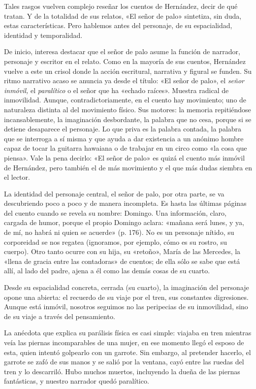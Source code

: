 \documentclass[14pt,twoside,final]{extbook} %
\begin{document}
Tales rasgos vuelven complejo reseñar los cuentos de Hernández, decir de qué tratan. Y de la totalidad de sus relatos, «El señor de palo» sintetiza, sin duda, estas características. Pero hablemos antes del personaje, de su espacialidad, identidad y temporalidad.

De inicio, interesa destacar que el señor de palo asume la función de narrador, personaje y escritor en el relato. Como en la mayoría de sus cuentos, Hernández vuelve a este un crisol donde la acción escritural, narrativa y figural se funden. Su ritmo narrativo acaso se anuncia ya desde el título: «El señor de palo», el \emph{señor inmóvil,} el \emph{paralítico} o el señor que ha «echado raíces». Muestra radical de inmovilidad. Aunque, contradictoriamente, en el cuento hay movimiento; uno de naturaleza distinta al del movimiento físico. Sus motores: la memoria repitiéndose incansablemente, la imaginación desbordante, la palabra que no cesa, porque si se detiene desaparece el personaje. Lo que priva es la palabra contada, la palabra que se interroga a sí misma y que ayuda a dar existencia a un anónimo hombre capaz de tocar la guitarra hawaiana o de trabajar en un circo como «la cosa que piensa». Vale la pena decirlo: «El señor de palo» es quizá el cuento más inmóvil de Hernández, pero también el de más movimiento y el que más dudas siembra en el lector.

La identidad del personaje central, el señor de palo, por otra parte, se va descubriendo poco a poco y de manera incompleta. Es hasta las últimas páginas del cuento cuando se revela su nombre: Domingo. Una información, claro, cargada de humor, porque el propio Domingo aclara: «mañana será lunes, y ya, de mí, no habrá ni quien se acuerde» (p. 176). No es un personaje nítido, su corporeidad se nos regatea (ignoramos, por ejemplo, cómo es su rostro, su cuerpo). Otro tanto ocurre con su hija, su «retoño», María de las Mercedes, la «llena de gracia entre las contadoras» de cuentos; de ella sólo se sabe que está allí, al lado del padre, ajena a él como las demás cosas de su cuarto.

Desde su espacialidad concreta, cerrada (su cuarto), la imaginación del personaje opone una abierta: el recuerdo de su viaje por el tren, sus constantes digresiones. Aunque está inmóvil, nosotros seguimos no las peripecias de su inmovilidad, sino de su viaje a través del pensamiento.

La anécdota que explica su parálisis física es casi simple: viajaba en tren mientras veía las piernas incomparables de una mujer, en ese momento llegó el esposo de esta, quien intentó golpearlo con un garrote. Sin embargo, al pretender hacerlo, el garrote se zafó de sus manos y se salió por la ventana, cayó entre las ruedas del tren y lo descarriló. Hubo muchos muertos, incluyendo la dueña de las piernas fantásticas, y nuestro narrador quedó paralítico.
\end{document}
